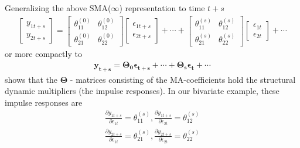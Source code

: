 \documentclass[a4paper,11pt,listof=nochaptergap,oneside,pointednumbers,bibtotoc,bigheadings,liststotoc,hidelinks]{scrbook}
\theoremstyle{mysatz}
\theoremstyle{mydefinition}
\theoremstyle{mytheorem}
\theoremstyle{mybemerkung}
\newcommand{\vect}[1]{\boldsymbol{\mathbf{#1}}}
\begin{document}
Generalizing the above SMA($\infty$) representation to time $t+s$
\begin{equation} \label{eq:svar10}
\begin{split}
	\begin{bmatrix}
    	y_{1t+s} \\
    	y_{2t+s}
 	\end{bmatrix} 
	=
	\begin{bmatrix}
    	\theta_{11}^{(0)} & \theta_{12}^{(0)}\\
    	\theta_{21}^{(0)} & \theta_{22}^{(0)}
 	\end{bmatrix} 
	\begin{bmatrix}
    	\epsilon_{1t + s} \\
	\epsilon_{2t+s}
 	\end{bmatrix} + \cdots +
	\begin{bmatrix}
    	\theta_{11}^{(s)} & \theta_{12}^{(s)}\\
    	\theta_{21}^{(s)} & \theta_{22}^{(s)}
 	\end{bmatrix} 
	\begin{bmatrix}
    	\epsilon_{1t} \\
	\epsilon_{2t}
 	\end{bmatrix} + \cdots 
\end{split}								
\end{equation}
or more compactly to 
\begin{equation} \label{eq:svar8_1}
\begin{split}
 		\vect{y_{t+s}} = 
		\vect{\Theta_0}\vect{\epsilon_{t+s}} + \cdots + \vect{\Theta_s}\vect{\epsilon_{t}} + \cdots
\end{split}								
\end{equation}
shows that the $\vect{\Theta}$ - matrices consisting of the MA-coefficients hold the structural dynamic multipliers (the impulse responses). In our bivariate example, these impulse responses are
\begin{equation} \label{eq:svar9}
\begin{split}
 		\frac{\partial y_{1t+s}}{\partial \epsilon_{1t}} = \theta_{11}^{(s)}, \frac{\partial y_{1t+s}}{\partial \epsilon_{2t}} = \theta_{12}^{(s)} \\
		\frac{\partial y_{2t+s}}{\partial \epsilon_{1t}} = \theta_{21}^{(s)}, \frac{\partial y_{2t+s}}{\partial \epsilon_{2t}} = \theta_{22}^{(s)}
\end{split}								
\end{equation}
\end{document}
